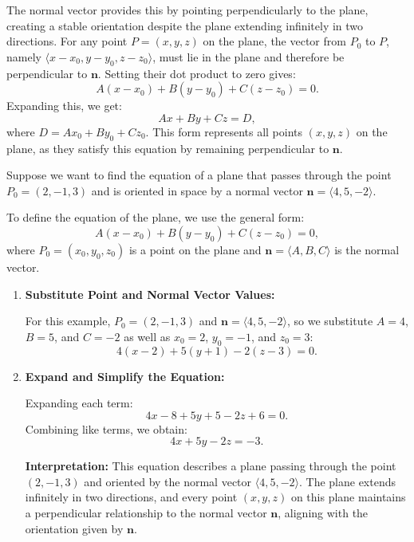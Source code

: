 \noindent The normal vector provides this by pointing perpendicularly to the plane, creating a stable orientation despite the plane extending infinitely in two directions. For any point \( P = (x, y, z) \) on the plane, the vector from \( P_0 \) to \( P \), namely \( \langle x - x_0, y - y_0, z - z_0 \rangle \), must lie in the plane and therefore be perpendicular to \( \mathbf{n} \). Setting their dot product to zero gives:
\[
A(x - x_0) + B(y - y_0) + C(z - z_0) = 0.
\]
Expanding this, we get:
\[
Ax + By + Cz = D,
\]
where \( D = Ax_0 + By_0 + Cz_0 \). This form represents all points \( (x, y, z) \) on the plane, as they satisfy this equation by remaining perpendicular to \( \mathbf{n} \).


\exampleline
\begin{example}
Suppose we want to find the equation of a plane that passes through the point \( P_0 = (2, -1, 3) \) and is oriented in space by a normal vector \( \mathbf{n} = \langle 4, 5, -2 \rangle \).

\begin{solution}
\noindent To define the equation of the plane, we use the general form:
\[
A(x - x_0) + B(y - y_0) + C(z - z_0) = 0,
\]
where \( P_0 = (x_0, y_0, z_0) \) is a point on the plane and \( \mathbf{n} = \langle A, B, C \rangle \) is the normal vector.

\begin{enumerate}
    \item \textbf{Substitute Point and Normal Vector Values:}
    
    \noindent For this example, \( P_0 = (2, -1, 3) \) and \( \mathbf{n} = \langle 4, 5, -2 \rangle \), so we substitute \( A = 4 \), \( B = 5 \), and \( C = -2 \) as well as \( x_0 = 2 \), \( y_0 = -1 \), and \( z_0 = 3 \):
    \[
    4(x - 2) + 5(y + 1) - 2(z - 3) = 0.
    \]

    \item \textbf{Expand and Simplify the Equation:}

    \noindent Expanding each term:
    \[
    4x - 8 + 5y + 5 - 2z + 6 = 0.
    \]
    Combining like terms, we obtain:
    \[
    4x + 5y - 2z = -3.
    \]

\noindent \textbf{Interpretation:} This equation describes a plane passing through the point \( (2, -1, 3) \) and oriented by the normal vector \( \langle 4, 5, -2 \rangle \). The plane extends infinitely in two directions, and every point \( (x, y, z) \) on this plane maintains a perpendicular relationship to the normal vector \( \mathbf{n} \), aligning with the orientation given by \( \mathbf{n} \).
\end{enumerate}
\end{solution}
\end{example}
\exampleline




